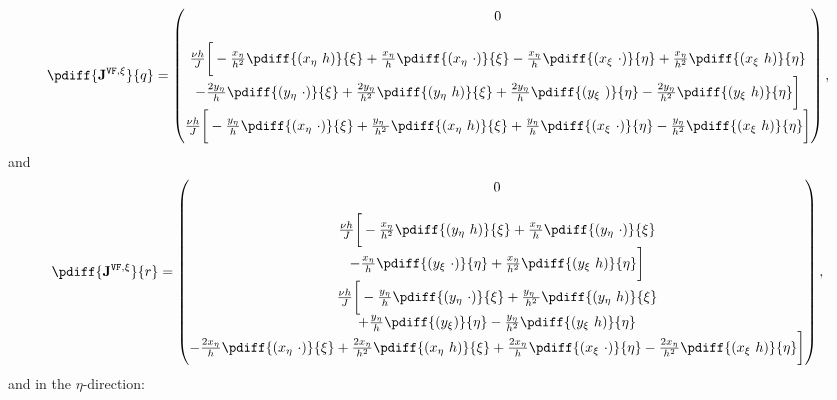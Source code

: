 \begin{align}
	\pdiff{\mathbf{J}^{\texttt{VF},\xi}}{q}=
		\begin{pmatrix}
	0 \\
	\\
	\frac{\nu h}{J} \bigg[
	-\frac{x_{\eta}}{h^2}\pdiff{(x_{\eta}\ h)}{\xi}
	+ \frac{x_{\eta}}{h} \pdiff{(x_{\eta}\ \cdot)}{\xi}
	- \frac{x_{\eta} }{h} \pdiff{(x_{\xi}\ \cdot)}{\eta}
	+ \frac{x_{\eta} }{h^2} \pdiff{ (x_{\xi}\ h)}{\eta}\\
	- \frac{2 y_{\eta}}{h}  \pdiff{ (y_{\eta}\ \cdot)}{\xi}
	+ \frac{2 y_{\eta} }{h^2}  \pdiff{ (y_{\eta}\ h)}{\xi}
	+ \frac{2 y_{\eta}}{h}  \pdiff{(y_{\xi}\ )}{\eta}
	- \frac{2 y_{\eta} }{h^2} \pdiff{(y_{\xi}\ h)}{\eta}\bigg]\\
	\frac{\nu h}{J} \bigg[
	- \frac{y_{\eta}}{h} \pdiff{(x_{\eta}\ \cdot)}{\xi}
	+ \frac{y_{\eta}\ }{h^2} \pdiff{(x_{\eta}\ h)}{\xi}
	+\frac{y_{\eta}}{h}   \pdiff{(x_{\xi}\ \cdot)}{\eta}
	-\frac{y_{\eta}}{h^2}   \pdiff{(x_{\xi}\ h)}{\eta}\bigg]
\end{pmatrix},
\end{align}
%
and
%
\begin{align}
	\pdiff{\mathbf{J}^{\texttt{VF},\xi}}{r}=
		\begin{pmatrix}
	0 \\
	\\
	\frac{\nu h}{J} \bigg[
	- \frac{x_{\eta}}{h^2} \pdiff{(y_{\eta}\ h)}{\xi}
	+ \frac{x_{\eta}}{h} \pdiff{(y_{\eta}\ \cdot)}{\xi}\\
	- \frac{x_{\eta} }{h} \pdiff{(y_{\xi}\ \cdot)}{\eta}
	+ \frac{x_{\eta}}{h^2} \pdiff{ (y_{\xi}\ h)}{\eta}\bigg]\\
	\frac{\nu h}{J} \bigg[
	- \frac{y_{\eta}}{h} \pdiff{(y_{\eta}\ \cdot)}{\xi}
	+ \frac{y_{\eta}\ }{h^2} \pdiff{(y_{\eta}\ h)}{\xi}\\
	+ \frac{y_{\eta}}{h} \pdiff{(y_{\xi} )}{\eta}
	- \frac{y_{\eta}}{h^2} \pdiff{(y_{\xi}\ h)}{\eta}\\
	- \frac{2 x_{\eta}}{h} \pdiff{(x_{\eta}\ \cdot)}{\xi}
	+ \frac{2 x_{\eta}}{h^2} \pdiff{(x_{\eta}\  h)}{\xi}
	+ \frac{2 x_{\eta}}{h}  \pdiff{(x_{\xi}\ \cdot)}{\eta}
	- \frac{2 x_{\eta}}{h^2}  \pdiff{(x_{\xi}\ h)}{\eta}\bigg]
\end{pmatrix} ,
\end{align}
%
and in the $\eta$-direction:
%
